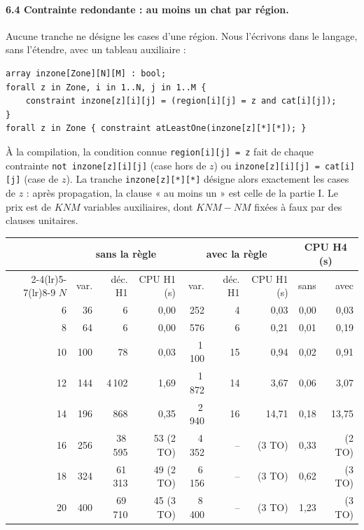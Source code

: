 \documentclass[11pt,a4paper]{article}
\newcommand{\code}[1]{\texttt{#1}}
\begin{document}
\paragraph{6.4 Contrainte redondante : au moins un chat par région.} Aucune tranche ne
désigne les cases d'une région. Nous l'écrivons dans le langage, sans l'étendre, avec un
tableau auxiliaire :
\begin{verbatim}
array inzone[Zone][N][M] : bool;
forall z in Zone, i in 1..N, j in 1..M {
    constraint inzone[z][i][j] = (region[i][j] = z and cat[i][j]);
}
forall z in Zone { constraint atLeastOne(inzone[z][*][*]); }
\end{verbatim}
À la compilation, la condition connue \code{region[i][j] = z} fait de chaque contrainte
\code{not inzone[z][i][j]} (case hors de $z$) ou \code{inzone[z][i][j] = cat[i][j]} (case de
$z$). La tranche \code{inzone[z][*][*]} désigne alors exactement les cases de $z$ : après
propagation, la clause « au moins un » est celle de la partie I. Le prix est de $K N M$
variables auxiliaires, dont $K N M - N M$ fixées à faux par des clauses unitaires.
\begin{center}
\begin{tabular}{r rrr rrr rr}
\toprule
 & \multicolumn{3}{c}{sans la règle} & \multicolumn{3}{c}{avec la règle} & \multicolumn{2}{c}{CPU H4 (s)} \\
\cmidrule(lr){2-4}\cmidrule(lr){5-7}\cmidrule(lr){8-9}
$N$ & var. & déc. H1 & CPU H1 (s) & var. & déc. H1 & CPU H1 (s) & sans & avec \\
\midrule
6  &  36 &       6 &          0,00 &    252 &  4 &       0,03 & 0,00 & 0,03 \\
8  &  64 &       6 &          0,00 &    576 &  6 &       0,21 & 0,01 & 0,19 \\
10 & 100 &      78 &          0,03 & 1\,100 & 15 &       0,94 & 0,02 & 0,91 \\
12 & 144 & 4\,102 &          1,69 & 1\,872 & 14 &       3,67 & 0,06 & 3,07 \\
14 & 196 &     868 &          0,35 & 2\,940 & 16 &      14,71 & 0,18 & 13,75 \\
16 & 256 & 38\,595 & 53 (2 TO) & 4\,352 & -- & (3 TO) & 0,33 & (2 TO) \\
18 & 324 & 61\,313 & 49 (2 TO) & 6\,156 & -- & (3 TO) & 0,62 & (3 TO) \\
20 & 400 & 69\,710 & 45 (3 TO) & 8\,400 & -- & (3 TO) & 1,23 & (3 TO) \\
\bottomrule
\end{tabular}
\end{center}
\end{document}
